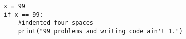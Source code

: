 \usepackage[cache=false]{minted}


\begin{verbatim}
x = 99
if x == 99:
    #indented four spaces
    print("99 problems and writing code ain't 1.")
\end{verbatim}
